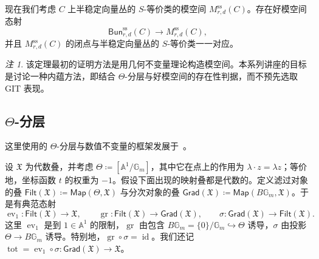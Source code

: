 \documentclass{amsart}
\theoremstyle{definition}
\theoremstyle{remark}
\newtheorem{rmk}[thm]{注}
\theoremstyle{plain}
\theoremstyle{definition}
\theoremstyle{remark}
\newcommand{\A}{\mathbb{A}}
\newcommand{\G}{\mathbb{G}}
\newcommand{\mf}[1]{\mathfrak{#1}}
\newcommand{\mr}[1]{\mathrm{#1}}
\newcommand{\on}[1]{\operatorname{#1}}
\newcommand{\ms}[1]{\mathsf{#1}}
\newcommand{\1}{\mathbf{1}}
\newcommand{\2}{\mathbf{2}}
\newcommand{\3}{\mathbf{3}}
\DeclareMathOperator{\ev}{ev}
\begin{document}
现在我们考虑 \(C\) 上半稳定向量丛的 \(S\)-等价类的模空间 \(M_{r,d}^{\mr{ss}}(C)\)。存在好模空间态射
\[
    \ms{Bun}_{r,d}^{\mr{ss}}(C)\longrightarrow M_{r,d}^{\mr{ss}}(C),
\]
并且 \(M_{r,d}^{\mr{ss}}(C)\) 的闭点与半稳定向量丛的 \(S\)-等价类一一对应。

\begin{rmk}
    该定理最初的证明方法是用几何不变量理论构造模空间。本系列讲座的目标是讨论一种内蕴方法，即结合 \(\Theta\)-分层与好模空间的存在性判据，而不预先选取 GIT 表现。
\end{rmk}



\subsection{\(\Theta\)-分层}%
\label{sub:Theta-stratifications}

这里使用的 \(\Theta\)-分层与数值不变量的框架发展于~\cite{HLinstability}。

设 \(\mf{X}\) 为代数叠，并考虑 \(\Theta\coloneqq[\A^1/\G_m]\)，其中它在点上的作用为 \(\lambda\cdot z=\lambda z\)；等价地，坐标函数 \(t\) 的权重为 \(-1\)。假设下面出现的映射叠都是代数的。定义滤过对象的叠 \(\ms{Filt}(\mf{X})\coloneqq\ms{Map}(\Theta,\mf{X})\) 与分次对象的叠 \(\ms{Grad}(\mf{X})\coloneqq\ms{Map}(B\G_m,\mf{X})\)。于是有典范态射
\[
    \ev_1\colon\ms{Filt}(\mf{X})\to\mf{X},
    \qquad
    \on{gr}\colon\ms{Filt}(\mf{X})\to\ms{Grad}(\mf{X}),
    \qquad
    \sigma\colon\ms{Grad}(\mf{X})\to\ms{Filt}(\mf{X}).
\]
这里 \(\ev_1\) 是到 \(1\in\A^1\) 的限制，\(\on{gr}\) 由包含 \(B\G_m=\{0\}/\G_m\hookrightarrow\Theta\) 诱导，\(\sigma\) 由投影 \(\Theta\to B\G_m\) 诱导。特别地，\(\on{gr}\circ\sigma=\on{id}\)。我们还记 \(\on{tot}=\ev_1\circ\sigma\colon\ms{Grad}(\mf{X})\to\mf{X}\)。
\end{document}
